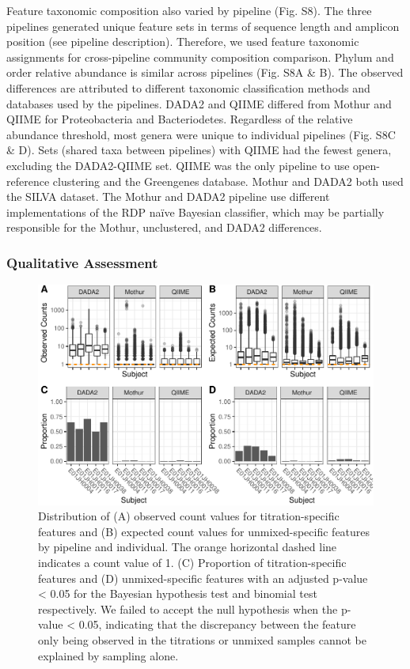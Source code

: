 \documentclass{bmcart}
\begin{document}
Feature taxonomic composition also varied by pipeline (Fig. S8). 
The three pipelines generated unique feature sets in terms of sequence
length and amplicon position (see pipeline description). Therefore, we
used feature taxonomic assignments for cross-pipeline community composition comparison.
Phylum and order relative abundance is similar
across pipelines (Fig. S8A \& B). The observed
differences are attributed to different taxonomic classification methods
and databases used by the pipelines. DADA2 and QIIME differed
from Mothur and QIIME for Proteobacteria and Bacteriodetes. Regardless
of the relative abundance threshold, most genera were
unique to individual pipelines (Fig. S8C \& D). Sets (shared taxa between pipelines) with QIIME had the fewest genera,
excluding the DADA2-QIIME set. QIIME was the only pipeline to use
open-reference clustering and the Greengenes database. Mothur and DADA2
both used the SILVA dataset. The Mothur and DADA2 pipeline use different
implementations of the RDP naïve Bayesian classifier, which may be
partially responsible for the Mothur, unclustered, and DADA2
differences.

\subsubsection*{Qualitative Assessment}

\begin{figure}
\centering
\includegraphics{qualPlot-1.pdf}
\caption{\label{fig:qualPlot}Distribution of (A) observed count values for
titration-specific features and (B) expected count values for
unmixed-specific features by pipeline and individual. The orange
horizontal dashed line indicates a count value of 1. (C) Proportion of
titration-specific features and (D) unmixed-specific features with an
adjusted p-value \textless{} 0.05 for the Bayesian hypothesis test and
binomial test respectively. We failed to accept the null hypothesis when
the p-value \textless{} 0.05, indicating that the discrepancy between
the feature only being observed in the titrations or unmixed samples
cannot be explained by sampling alone.}
\end{figure}
\end{document}
